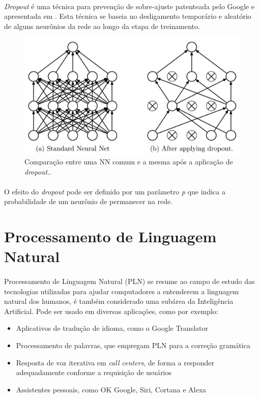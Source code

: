 \documentclass[grad,numbers]{coppe}
\begin{document}
  		\paragraph{}\textit{Dropout} é uma técnica para prevenção de sobre-ajuste patenteada pelo Google e apresentada em \cite{dropout-ex}. Esta técnica se baseia no desligamento temporário e aleatório de alguns neurônios da rede ao longo da etapa de treinamento.
			\begin{figure}[h]
  			\centering
  			\includegraphics[width=12cm]{dropout-ex.jpg}
  			\caption{Comparação entre uma NN comum e a mesma após a aplicação de \textit{dropout}.\cite{dropout-ex}.}
  			\label{fig:dropout-ex-fig}
  		\end{figure}
  		\paragraph{}O efeito do \textit{dropout} pode ser definido por um parâmetro \textit{p} que indica a probabilidade de um neurônio  de permanecer na rede.
  \section{Processamento de Linguagem Natural}
  	\paragraph{}Processamento de Linguagem Natural (PLN) se resume ao campo de estudo das tecnologias utilizadas para ajudar computadores a entenderem a linguagem natural dos humanos, é também considerado uma subárea da Inteligência Artificial. Pode ser usado em diversas aplicações\cite{simple-nlp}, como por exemplo:
  	\begin{itemize}
  		\item Aplicativos de tradução de idioma, como o Google Translator
  		\item Processamento de palavras, que empregam PLN para a correção gramática
  		\item Resposta de voz iterativa em \textit{call centers}, de forma a responder adequadamente conforme a requisição de usuários
  		\item Assistentes pessoais, como OK Google, Siri, Cortana e Alexa
  	\end{itemize}
\end{document}
